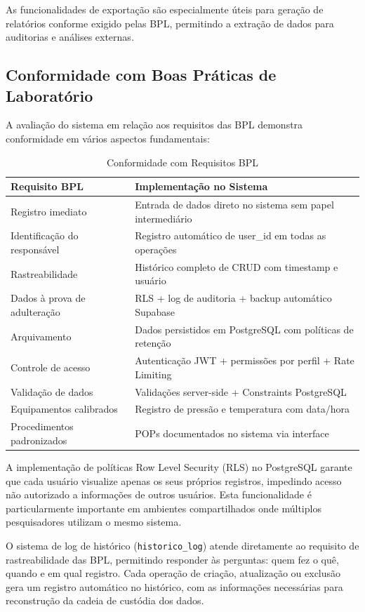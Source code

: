\documentclass[12pt,a4paper]{article}
\providecommand\关键字[1]{\textbf{#1}}
\begin{document}
As funcionalidades de exportação são especialmente úteis para geração de relatórios conforme exigido pelas BPL, permitindo a extração de dados para auditorias e análises externas.

\subsection{Conformidade com Boas Práticas de Laboratório}

A avaliação do sistema em relação aos requisitos das BPL demonstra conformidade em vários aspectos fundamentais:

\begin{table}[h!]
\centering
\caption{Conformidade com Requisitos BPL}
\label{tab:bpl-conformidade}
\begin{tabular}{@{}ll@{}}
\toprule
\textbf{Requisito BPL} & \textbf{Implementação no Sistema} \\
\midrule
Registro imediato & Entrada de dados direto no sistema sem papel intermediário \\
Identificação do responsável & Registro automático de user\_id em todas as operações \\
Rastreabilidade & Histórico completo de CRUD com timestamp e usuário \\
Dados à prova de adulteração & RLS + log de auditoria + backup automático Supabase \\
Arquivamento & Dados persistidos em PostgreSQL com políticas de retenção \\
Controle de acesso & Autenticação JWT + permissões por perfil + Rate Limiting \\
Validação de dados & Validações server-side + Constraints PostgreSQL \\
Equipamentos calibrados & Registro de pressão e temperatura com data/hora \\
Procedimentos padronizados & POPs documentados no sistema via interface \\
\bottomrule
\end{tabular}
\end{table}

A implementação de políticas Row Level Security (RLS) no PostgreSQL garante que cada usuário visualize apenas os seus próprios registros, impedindo acesso não autorizado a informações de outros usuários. Esta funcionalidade é particularmente importante em ambientes compartilhados onde múltiplos pesquisadores utilizam o mesmo sistema.

O sistema de log de histórico (\texttt{historico\_log}) atende diretamente ao requisito de rastreabilidade das BPL, permitindo responder às perguntas: quem fez o quê, quando e em qual registro. Cada operação de criação, atualização ou exclusão gera um registro automático no histórico, com as informações necessárias para reconstrução da cadeia de custódia dos dados.
\end{document}
